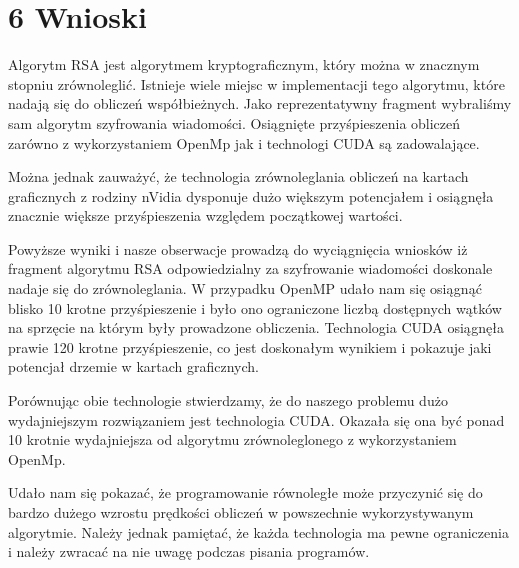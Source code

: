 \documentclass[a4paper,12pt]{article}
\begin{document}
\clearpage
\section*{6 Wnioski}
Algorytm RSA jest algorytmem kryptograficznym, który można w znacznym stopniu zrównoleglić. Istnieje wiele miejsc w implementacji tego algorytmu, które nadają się do obliczeń współbieżnych. Jako reprezentatywny fragment wybraliśmy sam algorytm szyfrowania wiadomości. Osiągnięte przyśpieszenia obliczeń zarówno z wykorzystaniem OpenMp jak i technologi CUDA są zadowalające. 

Można jednak zauważyć, że technologia zrównoleglania obliczeń na kartach graficznych z rodziny nVidia dysponuje dużo większym potencjałem i osiągnęła znacznie większe przyśpieszenia względem początkowej wartości. 

Powyższe wyniki i nasze obserwacje prowadzą do wyciągnięcia wniosków iż fragment algorytmu RSA odpowiedzialny za szyfrowanie wiadomości doskonale nadaje się do zrównoleglania. W przypadku OpenMP udało nam się osiągnąć blisko 10 krotne przyśpieszenie i było ono ograniczone liczbą dostępnych wątków na sprzęcie na którym były prowadzone obliczenia. Technologia CUDA osiągnęła prawie 120 krotne przyśpieszenie, co jest doskonałym wynikiem i pokazuje jaki potencjał drzemie w kartach graficznych.

Porównując obie technologie stwierdzamy, że do naszego problemu dużo wydajniejszym rozwiązaniem jest technologia CUDA. Okazała się ona być ponad 10 krotnie wydajniejsza od algorytmu zrównoleglonego z wykorzystaniem OpenMp.

Udało nam się pokazać, że programowanie równoległe może przyczynić się do bardzo dużego wzrostu prędkości obliczeń w powszechnie wykorzystywanym algorytmie. Należy jednak pamiętać, że każda technologia ma pewne ograniczenia i należy zwracać na nie uwagę podczas pisania programów.
	
\end{document}

